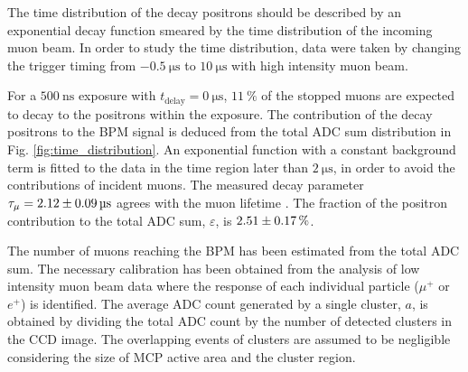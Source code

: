 \documentclass[preprint,3p,twocolumn]{elsarticle}
\begin{document}
The time distribution of the decay positrons should be described
by an exponential decay function smeared by the time distribution
of the incoming muon beam.  In order to study the time distribution, data
were taken by changing the trigger timing from
$\SI{-0.5}{\micro\s}$ to $\SI{10}{\micro\s}$ with high intensity
muon beam. %


For a $\SI{500}{\nano\s}$ exposure with $t_{\text{delay}} = \SI{0}{\micro\s}$, $\SI{11}{\percent}$ of the
stopped muons are expected to decay to the positrons within the
exposure.
The contribution of the decay positrons to the BPM
signal is deduced from the total ADC sum distribution in Fig. \ref{fig:time_distribution}. An exponential function with a constant background term is fitted to the data in the time region
later than $\SI{2}{\micro\s}$, in order to avoid the
contributions of incident muons. The measured decay parameter
$\tau_{\mu}=\SI{2.12 \pm 0.09}{\micro\s}$ agrees with the muon
lifetime \cite{muon_pdg}. The fraction of the positron contribution to the total
ADC sum, $\varepsilon$, is $\SI{2.51\pm0.17}{\percent}$.

The number of muons reaching the BPM has been estimated from the
total ADC sum. The necessary calibration has been obtained from
the analysis of low intensity muon beam data where the response
of each individual particle ($\mu^+$ or $e^+$) is identified. The
average ADC count generated by a single cluster, $a$, is obtained
by dividing the total ADC count by the number of detected
clusters in the CCD image. The overlapping events of clusters are assumed to be negligible considering the size of MCP active area and the cluster region.
\end{document}
